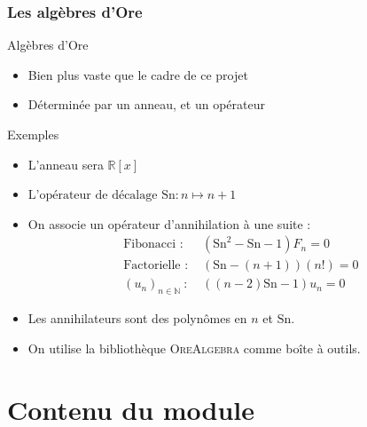 \documentclass{beamer}
\newcommand{\Sn}{\mathrm{Sn}}
\begin{document}
\begin{frame}
\frametitle{Les algèbres d'Ore}
\begin{center}
\begin{block}{Algèbres d'Ore}
    \begin{itemize}
        \item Bien plus vaste que le cadre de ce projet
        \item Déterminée par un anneau, et un opérateur
    \end{itemize}
\end{block}
\begin{exampleblock}{Exemples}
    \begin{itemize}
        \item L'anneau sera $\mathbb R[x]$
        \item $\text{L'opérateur de décalage } \Sn \colon n \mapsto n+1$
        \item On associe un opérateur d'annihilation à une suite :
            \vspace{-2ex}
            \begin{eqnarray*}
                \text{Fibonacci : } &(\Sn^2 - \Sn - 1)F_n = 0\\
                \text{Factorielle : } &(\Sn - (n+1))(n!) = 0\\
                (u_n)_{n\in\mathbb N}~\colon &((n-2)\Sn - 1)u_n = 0
            \end{eqnarray*}
        \item Les annihilateurs sont des polynômes en $n$ et $\Sn$.
        \item On utilise la bibliothèque \textsc{OreAlgebra} comme boîte à outils.
    \end{itemize}
\end{exampleblock}
\end{center}
\end{frame}

\section{Contenu du module}%
\end{document}
